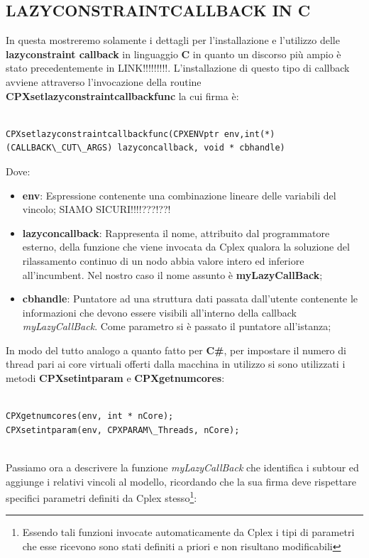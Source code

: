 \documentclass[11pt]{article}
\begin{document}
\subsection*{LAZYCONSTRAINTCALLBACK IN C}

In questa mostreremo solamente i dettagli per l'installazione e l'utilizzo delle \textbf{lazyconstraint callback} in linguaggio \textbf{C} in quanto un discorso più ampio è stato precedentemente in LINK!!!!!!!!!.
L'installazione di questo tipo di callback avviene attraverso l'invocazione della routine \textbf{CPXsetlazyconstraintcallbackfunc} la cui firma è:

\begin{lstlisting}

CPXsetlazyconstraintcallbackfunc(CPXENVptr env,int(*)(CALLBACK\_CUT\_ARGS) lazyconcallback, void * cbhandle)

\end{lstlisting}

Dove:

\begin{itemize}
    \item \textbf{env}: Espressione contenente una combinazione lineare delle variabili del vincolo; SIAMO SICURI!!!!???!??!
    \item \textbf{lazyconcallback}: Rappresenta il nome, attribuito dal programmatore esterno, della funzione che viene invocata da Cplex qualora la soluzione del rilassamento continuo di un nodo abbia valore intero ed inferiore all'incumbent. Nel nostro caso il nome assunto è \textbf{myLazyCallBack};
    \item \textbf{cbhandle}: Puntatore ad una struttura dati passata dall'utente contenente le informazioni che devono essere visibili all'interno della callback \textit{myLazyCallBack}. Come parametro si è passato il puntatore all'istanza;
\end{itemize}

In modo del tutto analogo a quanto fatto per \textbf{C\#}, per impostare il numero di thread pari ai core virtuali offerti dalla macchina in utilizzo si sono utilizzati i metodi \textbf{CPXsetintparam} e \textbf{CPXgetnumcores}:

\begin{lstlisting}

CPXgetnumcores(env, int * nCore);
CPXsetintparam(env, CPXPARAM\_Threads, nCore);


\end{lstlisting}

Passiamo ora a descrivere la funzione \textit{myLazyCallBack} che identifica i subtour ed aggiunge i relativi vincoli al modello, ricordando che la sua firma deve rispettare specifici parametri definiti da Cplex stesso\footnote{Essendo tali funzioni invocate automaticamente da Cplex i tipi di parametri che esse ricevono sono stati definiti a priori e non risultano modificabili}:
\end{document}
